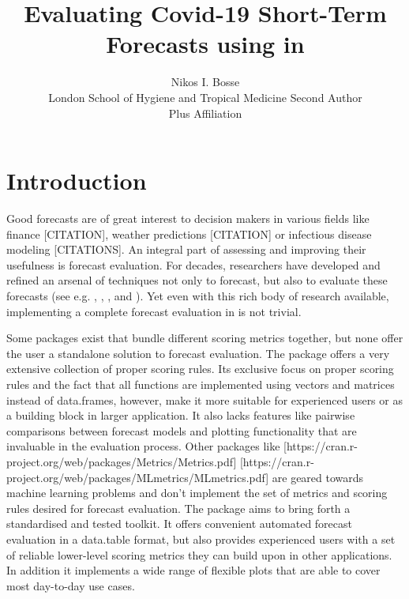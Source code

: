 \documentclass[article,shortnames]{jss}
\author{Nikos I. Bosse\\London School of Hygiene and Tropical Medicine
   \And Second Author\\Plus Affiliation}
\title{Evaluating Covid-19 Short-Term Forecasts using \pkg{scoringutils} in \proglang{R}}
\begin{document}


\section[Introduction]{Introduction}
Good forecasts are of great interest to decision makers in various fields like finance \citep{timmermannForecastingMethodsFinance2018} [CITATION], weather predictions [CITATION] or infectious disease modeling \citep{funkShorttermForecastsInform2020} [CITATIONS]. An integral part of assessing and improving their usefulness is forecast evaluation. For decades, researchers have developed and refined an arsenal of techniques not only to forecast, but also to evaluate these forecasts (see e.g. \cite{bracherEvaluatingEpidemicForecasts2021}, \cite{funkAssessingPerformanceRealtime2019}, \cite{gneitingProbabilisticForecastsCalibration2007}, and \cite{gneitingStrictlyProperScoring2007}). Yet even with this rich body of research available, implementing a complete forecast evaluation in  is not trivial. 

Some packages exist that bundle different scoring metrics together, but none offer the user a standalone solution to forecast evaluation. The  package \citep{scoringRules} offers a very extensive collection of proper scoring rules. Its exclusive focus on proper scoring rules and the fact that all functions are implemented using vectors and matrices instead of data.frames, however, make it more suitable for experienced users or as a building block in larger application. It also lacks features like pairwise comparisons between forecast models and plotting functionality that are invaluable in the evaluation process. Other packages like  [https://cran.r-project.org/web/packages/Metrics/Metrics.pdf]  [https://cran.r-project.org/web/packages/MLmetrics/MLmetrics.pdf] are geared towards machine learning problems and don't implement the set of metrics and scoring rules desired for forecast evaluation. The  package aims to bring forth a standardised and tested toolkit. It offers convenient automated forecast evaluation in a data.table format, but also provides experienced users with a set of reliable lower-level scoring metrics they can build upon in other applications. In addition it implements a wide range of flexible plots that are able to cover most day-to-day use cases. 
\end{document}

